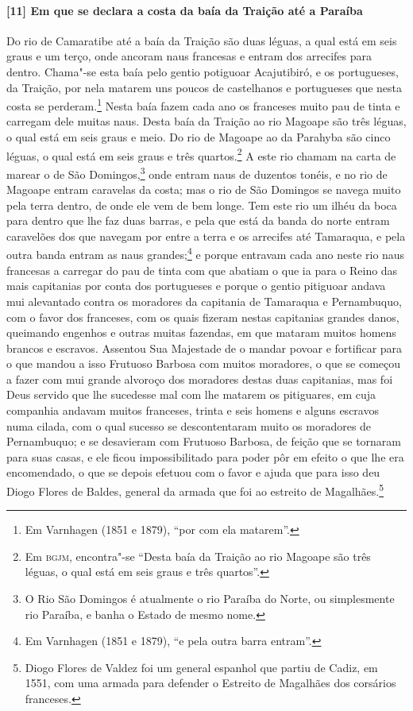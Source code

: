 \begin{linenumbers}
\paragraph{[11] Em que se declara a costa da baía da Traição até a Paraíba} \quad
Do rio de Camaratibe até a baía da Traição são duas léguas, a qual está em seis graus e um
terço, onde ancoram naus francesas e entram dos arrecifes para dentro. Chama"-se esta baía
pelo gentio potiguoar Acajutibiró, e os portugueses, da Traição, por nela matarem uns
poucos de castelhanos e portugueses que nesta costa se perderam.\footnote{ Em Varnhagen
(1851 e 1879), ``por com ela matarem''.} Nesta baía fazem cada ano os franceses muito pau
de tinta e carregam dele muitas naus. Desta baía da Traição ao rio Magoape são três
léguas, o qual está em seis graus e meio. Do rio de Magoape ao da Parahyba são cinco
léguas, o qual está em seis graus e três quartos.\footnote{ Em \textsc{bgjm}, encontra"-se
``Desta baía da Traição ao rio Magoape são três léguas, o qual está em seis graus e três
quartos''.} A este rio chamam na carta de marear o de São Domingos,\footnote{ O Rio São
Domingos é atualmente o rio Paraíba do Norte, ou simplesmente rio Paraíba, e banha o
Estado de mesmo nome.} onde entram naus de duzentos tonéis, e no rio de Magoape entram
caravelas da costa; mas o rio de São Domingos se navega muito pela terra dentro, de onde
ele vem de bem longe. Tem este rio um ilhéu da boca para dentro que lhe faz duas barras, e
pela que está da banda do norte entram caravelões dos que navegam por entre a terra e os
arrecifes até Tamaraqua, e pela outra banda entram as naus grandes;\footnote{ Em Varnhagen
(1851 e 1879), ``e pela outra barra entram''.} e porque entravam cada ano neste rio naus
francesas a carregar do pau de tinta com que abatiam o que ia para o Reino das mais
capitanias por conta dos portugueses e porque o gentio pitiguoar andava mui alevantado
contra os moradores da capitania de Tamaraqua e Pernambuquo, com o favor dos franceses,
com os quais fizeram nestas capitanias grandes danos, queimando engenhos e outras muitas
fazendas, em que mataram muitos homens brancos e escravos. Assentou Sua Majestade de o
mandar povoar e fortificar para o que mandou a isso Frutuoso Barbosa com muitos moradores,
o que se começou a fazer com mui grande alvoroço dos moradores destas duas capitanias, mas
foi Deus servido que lhe sucedesse mal com lhe matarem os pitiguares, em cuja companhia
andavam muitos franceses, trinta e seis homens e alguns escravos numa cilada, com o qual
sucesso se descontentaram muito os moradores de Pernambuquo; e se desavieram com Frutuoso
Barbosa, de feição que se tornaram para suas casas, e ele ficou impossibilitado para poder
pôr em efeito o que lhe era encomendado, o que se depois efetuou com o favor e ajuda que
para isso deu Diogo Flores de Baldes, general da armada que foi ao estreito de
Magalhães.\footnote{ Diogo Flores de Valdez foi um general espanhol que partiu de Cadiz,
em 1551, com uma armada para defender o Estreito de Magalhães dos corsários franceses.}


\end{linenumbers}

